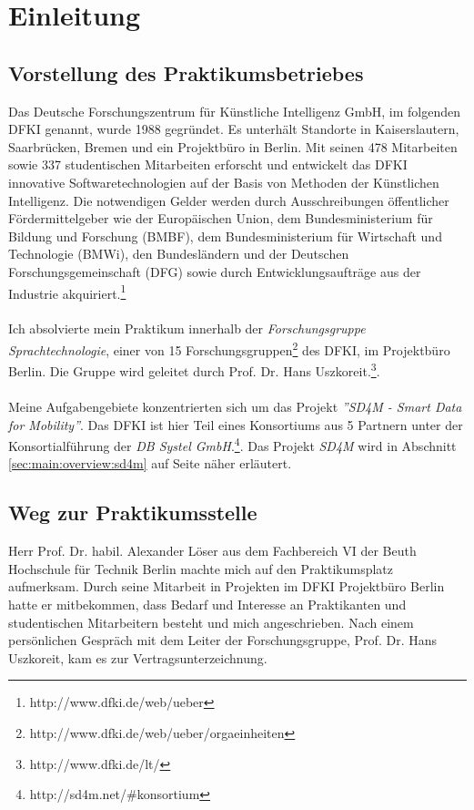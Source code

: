 \chapter{Einleitung}
\label{sec:intro}
\section{Vorstellung des Praktikumsbetriebes}
\label{sec:intro:dfki}
Das Deutsche Forschungszentrum für Künstliche Intelligenz GmbH, im folgenden DFKI genannt, wurde 1988 gegründet.
Es unterhält Standorte in Kaiserslautern, Saarbrücken, Bremen und ein Projektbüro in Berlin.
Mit seinen 478 Mitarbeiten sowie 337 studentischen Mitarbeiten erforscht und entwickelt das DFKI innovative Softwaretechnologien auf der Basis von Methoden der Künstlichen Intelligenz.
Die notwendigen Gelder werden durch Ausschreibungen öffentlicher Fördermittelgeber wie der Europäischen Union, dem Bundesministerium für Bildung und Forschung (BMBF), dem Bundesministerium für Wirtschaft und Technologie (BMWi), den Bundesländern und der Deutschen Forschungsgemeinschaft (DFG) sowie durch Entwicklungsaufträge aus der Industrie akquiriert.\footnote{http://www.dfki.de/web/ueber}
\\\\
Ich absolvierte mein Praktikum innerhalb der \textit{Forschungsgruppe Sprachtechnologie}, einer von 15 Forschungsgruppen\footnote{http://www.dfki.de/web/ueber/orgaeinheiten} des DFKI, im Projektbüro Berlin. Die Gruppe wird geleitet durch Prof. Dr. Hans Uszkoreit.\footnote{http://www.dfki.de/lt/}.
\\\\
Meine Aufgabengebiete konzentrierten sich um das Projekt \textit{''SD4M - Smart Data for Mobility''}. Das DFKI ist hier Teil eines Konsortiums aus 5 Partnern unter der Konsortialführung der \textit{DB Systel GmbH}.\footnote{http://sd4m.net/#konsortium}. 
Das Projekt \textit{SD4M} wird in Abschnitt \ref{sec:main:overview:sd4m} auf Seite \pageref{sec:main:overview:sd4m} näher erläutert.
\section{Weg zur Praktikumsstelle}
\label{sec:intro:wegZurPraktikumsstelle}
Herr Prof. Dr. habil. Alexander Löser aus dem Fachbereich VI der Beuth Hochschule für Technik Berlin machte mich auf den Praktikumsplatz aufmerksam. Durch seine Mitarbeit in Projekten im DFKI Projektbüro Berlin hatte er mitbekommen, dass Bedarf und Interesse an Praktikanten und studentischen Mitarbeitern besteht und mich angeschrieben. Nach einem persönlichen Gespräch mit dem Leiter der Forschungsgruppe, Prof. Dr. Hans Uszkoreit, kam es zur Vertragsunterzeichnung.